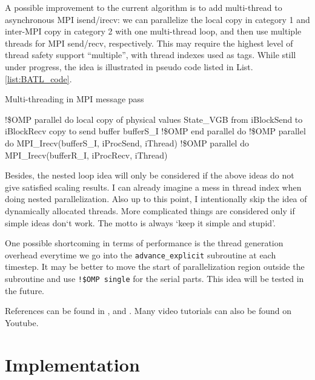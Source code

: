 \documentclass[fleqn,11pt]{SelfArx} %
\begin{document}
A possible improvement to the current algorithm is to add multi-thread to asynchronous MPI isend/irecv: we can parallelize the local copy in category 1 and inter-MPI copy in category 2 with one multi-thread loop, and then use multiple threads for MPI send/recv, respectively. This may require the highest level of thread safety support ``multiple'', with thread indexes used as tags. While still under progress, the idea is illustrated in pseudo code listed in List.\ref{list:BATL_code}.

\begin{algorithm}
\caption{Multi-threading in MPI message pass}\label{list:BATL_code}
\begin{algorithmic}[2]
\State !\$OMP parallel do
\State local copy of physical values State\_VGB from iBlockSend to iBlockRecv
\Else
\State copy to send buffer bufferS\_I
\EndIf
\EndFor
\State !\$OMP end parallel do
\State !\$OMP parallel do
\State MPI\_Irecv(bufferS\_I, iProcSend, iThread)
\EndFor
\State !\$OMP parallel do
\State MPI\_Irecv(bufferR\_I, iProcRecv, iThread)
\EndFor
\end{algorithmic}
\end{algorithm}

Besides, the nested loop idea will only be considered if the above ideas do not give satisfied scaling results. I can already imagine a mess in thread index when doing nested parallelization. Also up to this point, I intentionally skip the idea of dynamically allocated threads. More complicated things are considered only if simple ideas don`t work. The motto is always `keep it simple and stupid'.

One possible shortcoming in terms of performance is the thread generation overhead everytime we go into the \verb|advance_explicit| subroutine at each timestep. It may be better to move the start of parallelization region outside the subroutine and use \verb|!$OMP single| for the serial parts. This idea will be tested in the future.

References can be found in \cite{FortranOpenMPManual}, \cite{hybrid2013} and \cite{hybrid2017}. Many video tutorials can also be found on Youtube.


\section{Implementation}
\end{document}

